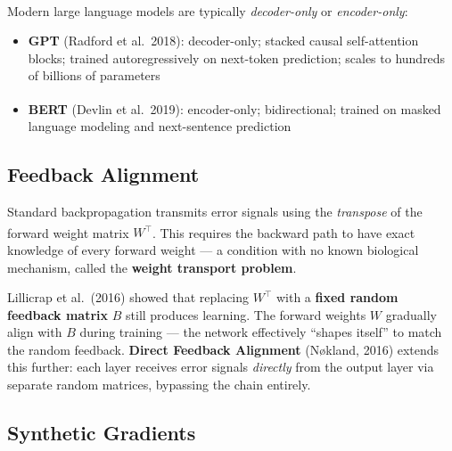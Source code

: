 \begin{tcbitemize}[ skin=sectionraster ]
    \tcbitem[title={GPT and BERT: Decoder- and Encoder-Only}, raster multicolumn=3]
    Modern large language models are typically \emph{decoder-only} or \emph{encoder-only}\textsuperscript{\cite[][pp.~97--99]{fleuretLittleBookDeep}}:
    \begin{itemize}
        \item \textbf{GPT} (Radford et al.\ 2018): decoder-only; stacked causal self-attention blocks; trained autoregressively on next-token prediction; scales to hundreds of billions of parameters
        \item \textbf{BERT}\textsuperscript{\cite[][]{devlinBERTPretrainingDeep2019}} (Devlin et al.\ 2019): encoder-only; bidirectional; trained on masked language modeling and next-sentence prediction
    \end{itemize}
\end{tcbitemize}

\subsection{Feedback Alignment}

\begin{tcbitemize}[ skin=sectionraster ]
    \tcbitem[title={The Weight Transport Problem}, raster multicolumn=3]
    Standard backpropagation transmits error signals using the \emph{transpose} of the forward weight matrix $W^\top$\textsuperscript{\cite[][p.~3]{fischerVorlesungGrundlagenNeuronale2024}}.
    This requires the backward path to have exact knowledge of every forward weight --- a condition with no known biological mechanism, called the \textbf{weight transport problem}.

    \tcbitem[title={Feedback Alignment}, raster multicolumn=3]
    Lillicrap et al.\ (2016) showed that replacing $W^\top$ with a \textbf{fixed random feedback matrix} $B$ still produces learning.
    The forward weights $W$ gradually align with $B$ during training --- the network effectively ``shapes itself'' to match the random feedback.
    \textbf{Direct Feedback Alignment} (N{\o}kland, 2016) extends this further: each layer receives error signals \emph{directly} from the output layer via separate random matrices, bypassing the chain entirely.
\end{tcbitemize}

\subsection{Synthetic Gradients}

